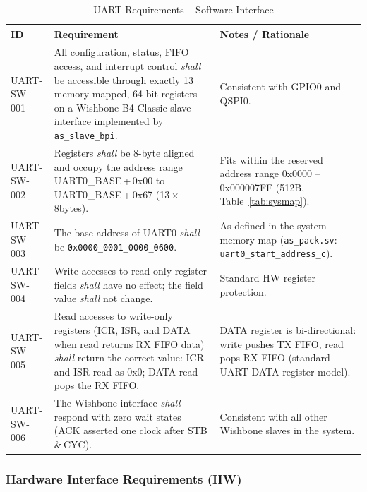 \begin{table}[H]
\caption{UART Requirements -- Software Interface}
\label{tab:asUartReqSW}
\centering
\begin{tabularx}{\textwidth}{|l |X |X|}
  \hline
  ID & Requirement & Notes / Rationale \\
  \hline
  \hline
  UART-SW-001 &
    All configuration, status, FIFO access, and interrupt control
    \textit{shall} be accessible through exactly 13 memory-mapped,
    64-bit registers on a Wishbone B4 Classic slave interface
    implemented by \texttt{as\_slave\_bpi}. &
    Consistent with GPIO0 and QSPI0. \\
  \hline
  UART-SW-002 &
    Registers \textit{shall} be 8-byte aligned and occupy the address
    range UART0\_BASE\,+\,0x00 to UART0\_BASE\,+\,0x67 (13\,$\times$\,8\;bytes). &
    Fits within the reserved address range
    0x0000\-0001\-0000\-0600 -- 0x0000\-0001\-0000\-07FF (512\;B, Table~\ref{tab:sysmap}). \\
  \hline
  UART-SW-003 &
    The base address of UART0 \textit{shall} be
    \texttt{0x0000\_0001\_0000\_0600}. &
    As defined in the system memory map (\texttt{as\_pack.sv}:
    \texttt{uart0\_start\_address\_c}). \\
  \hline
  UART-SW-004 &
    Write accesses to read-only register fields \textit{shall} have no
    effect; the field value \textit{shall} not change. &
    Standard HW register protection. \\
  \hline
  UART-SW-005 &
    Read accesses to write-only registers (ICR, ISR, and DATA when read
    returns RX FIFO data) \textit{shall} return the correct value:
    ICR and ISR read as 0x0; DATA read pops the RX FIFO. &
    DATA register is bi-directional: write pushes TX FIFO, read pops
    RX FIFO (standard UART DATA register model). \\
  \hline
  UART-SW-006 &
    The Wishbone interface \textit{shall} respond with zero wait states
    (ACK asserted one clock after STB\,\&\,CYC). &
    Consistent with all other Wishbone slaves in the system. \\
  \hline
\end{tabularx}
\end{table}

\subsubsection{Hardware Interface Requirements (HW)}


